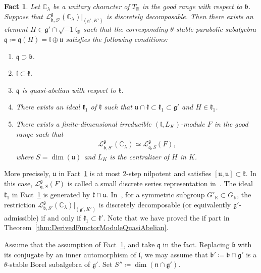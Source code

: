 \documentclass[pdftex]{sigma}
\numberwithin{equation}{section}
\newtheorem{Fact}[Theorem]{Fact}
\theoremstyle{definition}
\newcommand{\BasicRing}[1]{\mathbb{#1}}
\newcommand{\RR}{\BasicRing{R}}
\newcommand{\CC}{\BasicRing{C}}
\newcommand{\lie}[1]{\mathfrak{#1}}
\newcommand{\lmod}[3]{\mathcal{L}^{\lie{#1}}_{\lie{#2}, #3}}
\begin{document}
\begin{Fact}\label{fact:DiscDecompDiscSeries}
	Let $\CC_{\lambda}$ be a unitary character of $T_{\RR}$ in the good range with respect to $\lie{b}$.
	Suppose that $\lmod{g}{b}{S'}(\CC_{\lambda})|_{(\lie{g}', K')}$ is discretely decomposable.
	Then there exists an element $H \in \lie{g}' \cap \sqrt{-1}\lie{t}_\RR$ such that
	the corresponding $\theta$-stable parabolic subalgebra $\lie{q}\coloneq \lie{q}(H) = \lie{l}\oplus \lie{u}$
	satisfies the following conditions:
	\begin{enumerate}\itemsep=0pt
		\item[$1.$] $\lie{q} \supset \lie{b}$.
		\item[$2.$] $\lie{l}\subset \lie{k}$.
		\item[$3.$] $\lie{q}$ is quasi-abelian with respect to $\lie{k}$.
		\item[$4.$] There exists an ideal $\lie{k}_1$ of $\lie{k}$ such that
		$\lie{u} \cap \lie{k} \subset \lie{k}_1\subset \lie{g}'$ and $H \in \lie{k}_1$.
		\item[$5.$]%
There exists a finite-dimensional irreducible $(\lie{l}, L_K)$-module $F$ in the good range such that
		\begin{align*}
			\lmod{g}{b}{S'}(\CC_{\lambda}) \simeq \lmod{g}{q}{S}(F),
		\end{align*}
		where $S=\dim(\lie{u})$ and $L_K$ is the centralizer of $H$ in $K$.
	\end{enumerate}
\end{Fact}

More precisely, $\lie{u}$ in Fact~\ref{fact:DiscDecompDiscSeries} is at most 2-step nilpotent and satisfies $[\lie{u}, \lie{u}]\subset \lie{k}$.
In this case, $\lmod{g}{q}{S}(F)$ is called a small discrete series representation in~\cite{GrWa00}.
The ideal $\lie{k}_1$ in Fact~\ref{fact:DiscDecompDiscSeries} is generated by $\lie{k}\cap \lie{u}$.
In~\cite[Corollary~1]{DuVa10}, for a symmetric subgroup $G'_\RR\subset G_\RR$, the restriction $\lmod{g}{b}{S'}(\CC_{\lambda})|_{(\lie{g}', K')}$ is discretely decomposable (or equivalently $\lie{g'}$-admissible) if and only if $\lie{k}_1\subset \lie{k}'$.
Note that we have proved the if part in Theorem~\ref{thm:DerivedFunctorModuleQuasiAbelian}.

Assume that the assumption of Fact~\ref{fact:DiscDecompDiscSeries}, and take $\lie{q}$ in the fact.
Replacing $\lie{b}$ with its conjugate by an inner automorphism of $\lie{l}$, we may assume that $\lie{b'}\coloneq \lie{b}\cap \lie{g'}$ is a $\theta$-stable Borel subalgebra of $\lie{g'}$.
Set $S''\coloneq \dim(\lie{n} \cap \lie{g'})$.
\end{document}
